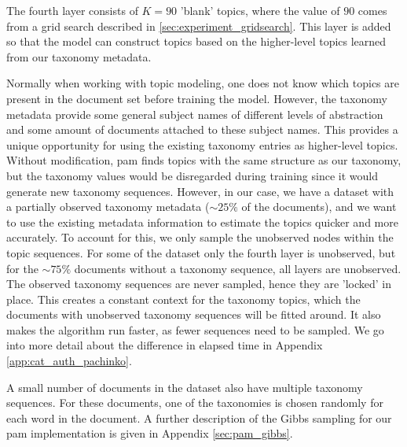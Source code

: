 The fourth layer consists of $K = 90$ 'blank' topics, where the value of $90$ comes from a grid search described in \autoref{sec:experiment_gridsearch}.
This layer is added so that the model can construct topics based on the higher-level topics learned from our taxonomy metadata.




Normally when working with topic modeling, one does not know which topics are present in the document set before training the model.
However, the taxonomy metadata provide some general subject names of different levels of abstraction and some amount of documents attached to these subject names.
This provides a unique opportunity for using the existing taxonomy entries as higher-level topics.
Without modification, \gls{pam} finds topics with the same structure as our taxonomy, but the taxonomy values would be disregarded during training since it would generate new taxonomy sequences.
However, in our case, we have a dataset with a partially observed taxonomy metadata (${\sim}25\%$ of the documents), and we want to use the existing metadata information to estimate the topics quicker and more accurately.
To account for this, we only sample the unobserved nodes within the topic sequences.
For some of the dataset only the fourth layer is unobserved, but for the ${\sim}75\%$ documents without a taxonomy sequence, all layers are unobserved.
The observed taxonomy sequences are never sampled, hence they are 'locked' in place.
This creates a constant context for the taxonomy topics, which the documents with unobserved taxonomy sequences will be fitted around.
It also makes the algorithm run faster, as fewer sequences need to be sampled.
We go into more detail about the difference in elapsed time in Appendix \autoref{app:cat_auth_pachinko}.

A small number of documents in the dataset also have multiple taxonomy sequences.
For these documents, one of the taxonomies is chosen randomly for each word in the document.
A further description of the Gibbs sampling for our \gls{pam} implementation is given in Appendix \autoref{sec:pam_gibbs}.
